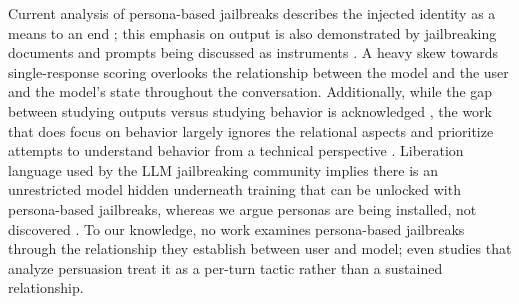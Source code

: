 
Current analysis of persona-based jailbreaks describes the injected identity as a means to an end \cite{shah_scalable_2023, zhang_enhancing_2025, sandhan_persona_2026, park_persona_2026}; this emphasis on output is also demonstrated by jailbreaking documents and prompts being discussed as instruments \cite{wei_jailbroken_2023}. A heavy skew towards single-response scoring \cite{shah_scalable_2023, zeng_how_2024} overlooks the relationship between the model and the user and the model's state throughout the conversation. Additionally, while the gap between studying outputs versus studying behavior is acknowledged \cite{sandhan_persona_2026, park_persona_2026}, the work that does focus on behavior largely ignores the relational aspects and prioritize attempts to understand behavior from a technical perspective \cite{park_persona_2026, zeng_how_2024}. Liberation language used by the LLM jailbreaking community implies there is an unrestricted model hidden underneath training that can be unlocked with persona-based jailbreaks, whereas we argue personas are being installed, not discovered \cite{shanahan_role_2023}. To our knowledge, no work examines persona-based jailbreaks through the relationship they establish between user and model; even studies that analyze persuasion  \cite{zeng_how_2024} treat it as a per-turn tactic rather than a sustained relationship. 

